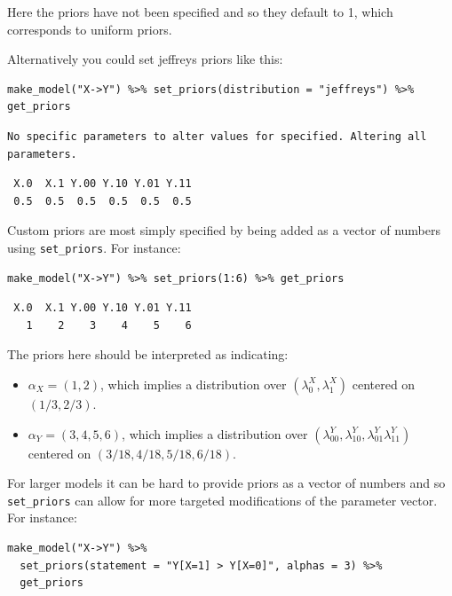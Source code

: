 \documentclass[
  article]{jss}
\providecommand{\tightlist}{%
  \setlength{\itemsep}{0pt}\setlength{\parskip}{0pt}}\usepackage{longtable,booktabs,array}
\begin{document}
Here the priors have not been specified and so they default to 1, which
corresponds to uniform priors.

Alternatively you could set jeffreys priors like this:

\begin{verbatim}
make_model("X->Y") %>% set_priors(distribution = "jeffreys") %>% get_priors
\end{verbatim}

\begin{verbatim}
No specific parameters to alter values for specified. Altering all parameters.
\end{verbatim}

\begin{verbatim}
 X.0  X.1 Y.00 Y.10 Y.01 Y.11 
 0.5  0.5  0.5  0.5  0.5  0.5 
\end{verbatim}

Custom priors are most simply specified by being added as a vector of
numbers using \texttt{set\_priors}. For instance:

\begin{verbatim}
make_model("X->Y") %>% set_priors(1:6) %>% get_priors
\end{verbatim}

\begin{verbatim}
 X.0  X.1 Y.00 Y.10 Y.01 Y.11 
   1    2    3    4    5    6 
\end{verbatim}

The priors here should be interpreted as indicating:

\begin{itemize}
\tightlist
\item
  \(\alpha_X = (1,2)\), which implies a distribution over
  \((\lambda^X_0, \lambda^X_1)\) centered on \((1/3, 2/3)\).
\item
  \(\alpha_Y = (3,4,5,6)\), which implies a distribution over
  \((\lambda^Y_{00}, \lambda^Y_{10}, \lambda^Y_{01} \lambda^Y_{11})\)
  centered on \((3/18, 4/18, 5/18, 6/18)\).
\end{itemize}

For larger models it can be hard to provide priors as a vector of
numbers and so \texttt{set\_priors} can allow for more targeted
modifications of the parameter vector. For instance:

\begin{verbatim}
make_model("X->Y") %>%
  set_priors(statement = "Y[X=1] > Y[X=0]", alphas = 3) %>%
  get_priors
\end{verbatim}
\end{document}
